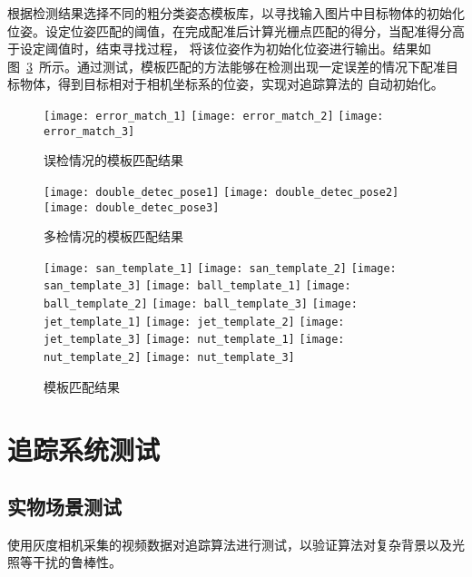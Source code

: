 根据检测结果选择不同的粗分类姿态模板库，以寻找输入图片中目标物体的初始化位姿。设定位姿匹配的阈值，在完成配准后计算光栅点匹配的得分，当配准得分高于设定阈值时，结束寻找过程，
将该位姿作为初始化位姿进行输出。结果如图~\ref{fig:chap05:pose_estimate_template_match}~所示。通过测试，模板匹配的方法能够在检测出现一定误差的情况下配准目标物体，得到目标相对于相机坐标系的位姿，实现对追踪算法的
自动初始化。


\begin{figure}[t] %
    \centering%
    \texttt{[image: error\_match\_1]}
    \texttt{[image: error\_match\_2]}
    \texttt{[image: error\_match\_3]}
    \caption{误检情况的模板匹配结果}
    \label{fig:chap05:error_pose_match}
    \end{figure}
\begin{figure}[t] %
    \centering%
    \texttt{[image: double\_detec\_pose1]}
    \texttt{[image: double\_detec\_pose2]}
    \texttt{[image: double\_detec\_pose3]}
    \caption{多检情况的模板匹配结果}
    \label{fig:chap05:multi_pose_match}
    \end{figure}


\begin{figure}[t] %
    \centering%
        \texttt{[image: san\_template\_1]}
        \texttt{[image: san\_template\_2]}
        \texttt{[image: san\_template\_3]}
        \vskip 1pt
        \texttt{[image: ball\_template\_1]}
        \texttt{[image: ball\_template\_2]}
        \texttt{[image: ball\_template\_3]}
        \vskip 1pt
        \texttt{[image: jet\_template\_1]}
        \texttt{[image: jet\_template\_2]}
        \texttt{[image: jet\_template\_3]}
        \vskip 1pt
        \texttt{[image: nut\_template\_1]}
        \texttt{[image: nut\_template\_2]}
        \texttt{[image: nut\_template\_3]}
    \caption{模板匹配结果}
    \label{fig:chap05:pose_estimate_template_match}
    \end{figure}

\section{追踪系统测试}
\label{sec:track_test}
\subsection{实物场景测试}
\label{sec:real_video_test}
使用灰度相机采集的视频数据对追踪算法进行测试，以验证算法对复杂背景以及光照等干扰的鲁棒性。

